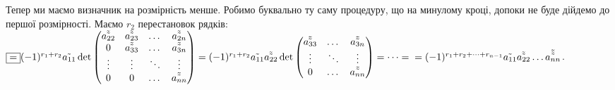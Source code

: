 \documentclass[a4paper, 10pt]{article}
\theoremstyle{theoremdd}
\begin{document}
Тепер ми маємо визначник на розмірність менше. Робимо буквально ту саму процедуру, що на минулому кроці, допоки не буде дійдемо до першої розмірності. Маємо $r_2$ перестановок рядків:\\
$\boxed{=} (-1)^{r_1+r_2} \tilde{a_{11}} \det \begin{pmatrix}
\tilde{\tilde{a_{22}}} & \tilde{\tilde{a_{23}}} & \dots & \tilde{\tilde{a_{2n}}} \\
0 & \tilde{\tilde{a_{33}}} & \dots & \tilde{\tilde{a_{3n}}} \\
\vdots & \vdots & \ddots & \vdots \\
0 & 0 & \dots & \tilde{\tilde{a_{nn}}} \\
\end{pmatrix} = (-1)^{r_1+r_2} \tilde{a_{11}} \tilde{\tilde{a_{22}}} \det \begin{pmatrix}
\tilde{\tilde{a_{33}}} & \dots & \tilde{\tilde{a_{3n}}} \\
\vdots & \ddots & \vdots \\
0 & \dots & \tilde{\tilde{a_{nn}}} \\
\end{pmatrix} = \dots = \\ = (-1)^{r_1+r_2+\dots+r_{n-1}} \tilde{a_{11}} \tilde{\tilde{a_{22}}} \dots \tilde{\tilde{\tilde{{a_{nn}}}}}$.
\end{document}

